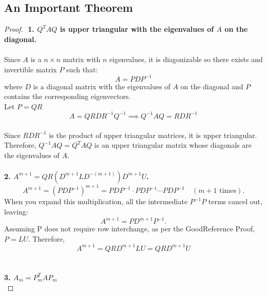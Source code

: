 \documentclass[12pt]{article}
\begin{document}
\subsection{An Important Theorem}
    \begin{proof} $ $\newline
        \textbf{1. $Q^TAQ$ is upper triangular with the eigenvalues of $A$ on the diagonal.} \\\\
        Since $A$ is a $n \times n$ matrix with $n$ eigenvalues, it is diagonizable so there exists and invertible matrix $P$ such that: \\
        $$A = PDP^{-1}$$
        where $D$ is a diagonal matrix with the eigenvalues of $A$ on the diagonal and $P$ contains the corresponding eigenvectors. \\
        Let $P=QR$
        \[
        A = QR D R^{-1}Q^{-1} \implies Q^{-1}AQ = R D R^{-1}
        \]\\
        Since $RDR^{-1}$ is the product of upper triangular matrices, it is upper triangular. Therefore, $Q^{-1}AQ = Q^TAQ$ is 
        an upper triangular matrix whose diagonals are the eigenvalues of $A$.\\\\
        \textbf{2. $A^{m+1} = QR (D^{m+1} L D^{-(m+1)})D^{m+1}U$.} \\
        \[
        A^{m+1} = (PDP^{-1})^{m+1} = P D P^{-1} \cdot P D P^{-1} \cdots P D P^{-1} \quad (m + 1 \text{ times}).
        \]
        When you expand this multiplication, all the intermediate \( P^{-1}P \) terms cancel out, leaving:
        \[
        A^{m+1} = P D^{m+1} P^{-1}.
        \]
        Assuming P does not require row interchange, as per the GoodReference Proof, $P=LU$. Therefore, \\
        \[
        A^{m+1} = QR D^{m+1} LU = QR D^{m+1}U \tag{1}
        \] \\ \\
        \textbf{3. $A_m = P_m^TAP_m$} \\
       

\end{proof}
\end{document}
